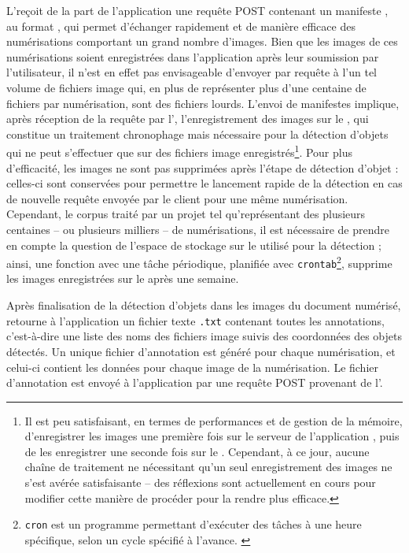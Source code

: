 	L'\api reçoit de la part de l'application une requête POST contenant un manifeste \iiif, au format \json, qui permet d'échanger rapidement et de manière efficace des numérisations comportant un grand nombre d'images. Bien que les images de ces numérisations soient enregistrées dans l'application \eida après leur soumission par l'utilisateur, il n'est en effet pas envisageable d'envoyer par requête \http à l'\api un tel volume de fichiers image qui, en plus de représenter plus d'une centaine de fichiers par numérisation, sont des fichiers lourds. L'envoi de manifestes \iiif implique, après réception de la requête par l'\api, l'enregistrement des images sur le \gpu, qui constitue un traitement chronophage mais nécessaire pour la détection d'objets qui ne peut s'effectuer que sur des fichiers image enregistrés\footnote{Il est peu satisfaisant, en termes de performances et de gestion de la mémoire, d'enregistrer les images une première fois sur le serveur de l'application \eida, puis de les enregistrer une seconde fois sur le \gpu. Cependant, à ce jour, aucune chaîne de traitement ne nécessitant qu'un seul enregistrement des images ne s'est avérée satisfaisante -- des réflexions sont actuellement en cours pour modifier cette manière de procéder pour la rendre plus efficace.}. Pour plus d'efficacité, les images ne sont pas supprimées après l'étape de détection d'objet : celles-ci sont conservées pour permettre le lancement rapide de la détection en cas de nouvelle requête envoyée par le client pour une même numérisation. Cependant, le corpus traité par un projet tel qu'\eida représentant des plusieurs centaines -- ou plusieurs milliers -- de numérisations, il est nécessaire de prendre en compte la question de l'espace de stockage sur le \gpu utilisé pour la détection ; ainsi, une fonction avec une tâche périodique, planifiée avec \texttt{crontab}\footnote{\texttt{cron} est un programme permettant d'exécuter des tâches à une heure spécifique, selon un cycle spécifié à l'avance. \cite{Cron2023}}, supprime les images enregistrées sur le \gpu après une semaine.
	
	Après finalisation de la détection d'objets dans les images du document numérisé, \exapi retourne à l'application un fichier texte \texttt{.txt} contenant toutes les annotations, c'est-à-dire une liste des noms des fichiers image suivis des coordonnées des objets détectés. Un unique fichier d'annotation est généré pour chaque numérisation, et celui-ci contient les données pour chaque image de la numérisation. Le fichier d'annotation est envoyé à l'application \eida par une requête POST provenant de l'\api.
	

